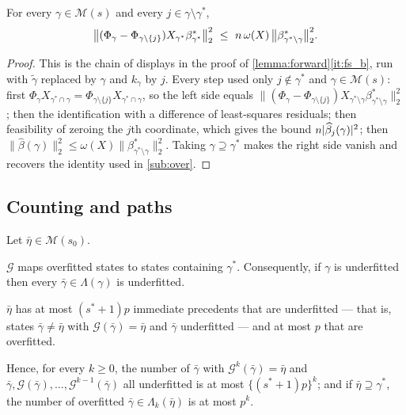 \begin{lemma}
    \label{lemma:proxy}
    For every $\gamma\in\mathscr{M}(s)$ and every
    $j\in\gamma\setminus\gamma^{\ast}$,
    \begin{equation}
        \label{eq:proxy}
        \bigl\|(\Phi_{\gamma}-\Phi_{\gamma\setminus\{j\}})
        X_{\gamma^{\ast}}\beta^{\ast}_{\gamma^{\ast}}\bigr\|_2^{2}
        \ \leq\ n\,\omega(X)\,
        \bigl\|\beta^{\ast}_{\gamma^{\ast}\setminus\gamma}\bigr\|_2^{2} .
    \end{equation}
\end{lemma}

\begin{proof}
    This is the chain of displays in the proof of
    \cref{lemma:forward}\ref{it:fs_b}, run with $\widetilde\gamma$
    replaced by $\gamma$ and $k_\gamma$ by $j$. Every step used only
    $j\notin\gamma^{\ast}$ and $\gamma\in\mathscr{M}(s)$: first
    $\Phi_{\gamma}X_{\gamma^{\ast}\cap\gamma}
    =\Phi_{\gamma\setminus\{j\}}X_{\gamma^{\ast}\cap\gamma}$, so the left
    side equals $\|(\Phi_\gamma-\Phi_{\gamma\setminus\{j\}})
    X_{\gamma^{\ast}\setminus\gamma}
    \beta^{\ast}_{\gamma^{\ast}\setminus\gamma}\|_2^{2}$; then the
    identification with a difference of least-squares residuals; then
    feasibility of zeroing the $j$th coordinate, which gives the bound
    $n\lvert\widehat\beta_j(\gamma)\rvert^{2}$; then
    $\|\widehat\beta(\gamma)\|_2^{2}\leq\omega(X)
    \|\beta^{\ast}_{\gamma^{\ast}\setminus\gamma}\|_2^{2}$. Taking
    $\gamma\supseteq\gamma^{\ast}$ makes the right side vanish and
    recovers the identity used in \cref{sub:over}.
\end{proof}

\subsection{Counting and paths}
\label{sub:appcount}

\begin{lemma}
    \label{lemma:count}
    Let $\bar\eta\in\mathscr{M}(s_0)$.
    \begin{equivcond}
        \item\label{it:cnt_i} $\mathcal{G}$ maps overfitted states to
        states containing $\gamma^{\ast}$. Consequently, if $\gamma$ is
        underfitted then every $\bar\gamma\in\Lambda(\gamma)$ is
        underfitted.
        \item\label{it:cnt_ii} $\bar\eta$ has at most $(s^{\ast}+1)p$
        immediate precedents that are underfitted --- that is, states
        $\bar\gamma\neq\bar\eta$ with
        $\mathcal{G}(\bar\gamma)=\bar\eta$ and $\bar\gamma$ underfitted
        --- and at most $p$ that are overfitted.
        \item\label{it:cnt_iii} Hence, for every $k\geq0$, the number of
        $\bar\gamma$ with $\mathcal{G}^{k}(\bar\gamma)=\bar\eta$ and
        $\bar\gamma,\mathcal{G}(\bar\gamma),\dots,
        \mathcal{G}^{k-1}(\bar\gamma)$ all underfitted is at most
        $\{(s^{\ast}+1)p\}^{k}$; and if
        $\bar\eta\supseteq\gamma^{\ast}$, the number of overfitted
        $\bar\gamma\in\Lambda_k(\bar\eta)$ is at most $p^{k}$.
    \end{equivcond}
\end{lemma}

